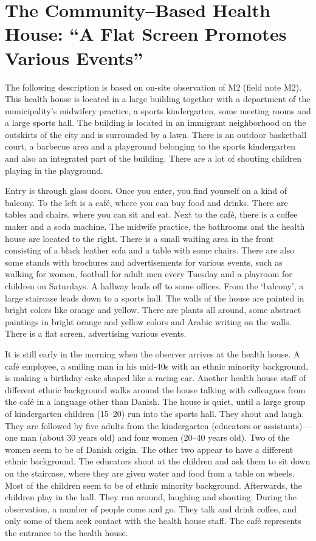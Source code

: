 \section{The Community--Based Health House: “A Flat Screen Promotes Various Events”}
The following description is based on on-site observation of M2 (field note M2). This health house is located in a large building together with a department of the municipality’s midwifery practice, a sports kindergarten, some meeting rooms and a large sports hall. The building is located in an immigrant neighborhood on the outskirts of the city and is surrounded by a lawn. There is an outdoor basketball court, a barbecue area and a playground belonging to the sports kindergarten and also an integrated part of the building. There are a lot of shouting children playing in the playground.
\par
Entry is through glass doors. Once you enter, you find yourself on a kind of balcony. To the left is a café, where you can buy food and drinks. There are tables and chairs, where you can sit and eat. Next to the café, there is a coffee maker and a soda machine. The midwife practice, the bathrooms and the health house are located to the right. There is a small waiting area in the front consisting of a black leather sofa and a table with some chairs. There are also some stands with brochures and advertisements for various events, such as walking for women, football for adult men every Tuesday and a playroom for children on Saturdays. A hallway leads off to some offices. From the ‘balcony’, a large staircase leads down to a sports hall. The walls of the house are painted in bright colors like orange and yellow. There are plants all around, some abstract paintings in bright orange and yellow colors and Arabic writing on the walls. There is a flat screen, advertising various events.
\par
It is still early in the morning when the observer arrives at the health house. A café employee, a smiling man in his mid-40s with an ethnic minority background, is making a birthday cake shaped like a racing car. Another health house staff of different ethnic background walks around the house talking with colleagues from the café in a language other than Danish. The house is quiet, until a large group of kindergarten children (15--20) run into the sports hall. They shout and laugh. They are followed by five adults from the kindergarten (educators or assistants)---one man (about 30 years old) and four women (20--40 years old). Two of the women seem to be of Danish origin. The other two appear to have a different ethnic background. The educators shout at the children and ask them to sit down on the staircase, where they are given water and food from a table on wheels. Most of the children seem to be of ethnic minority background. Afterwards, the children play in the hall. They run around, laughing and shouting. During the observation, a number of people come and go. They talk and drink coffee, and only some of them seek contact with the health house staff. The café represents the entrance to the health house.
